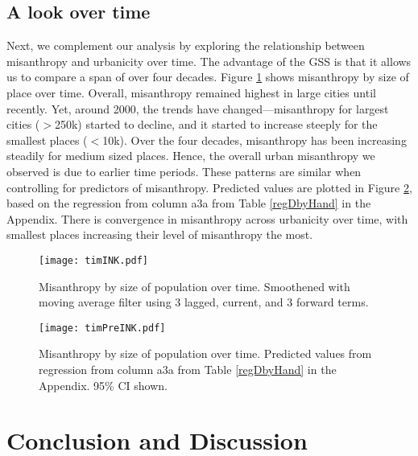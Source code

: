 \documentclass[11pt, letterpaper]{article}
\begin{document}
\begin{spacing}{1.4}
\subsection*{A look over time}

Next, we complement our analysis by exploring the relationship between misanthropy and urbanicity over time. The advantage of the GSS is that it allows us to compare a span of over four decades. Figure \ref{tim} shows misanthropy by size of place over time. Overall, misanthropy remained highest in large cities until recently. Yet, around 2000, the trends have changed---misanthropy for largest cities ($>$250k) started to decline, and it started to increase steeply for the smallest places ($<$10k). Over the four decades, misanthropy has been increasing steadily for medium sized places. Hence, the overall urban misanthropy we observed is due to earlier time periods. 
%
These patterns are similar when controlling for predictors of
misanthropy. Predicted values are plotted in Figure \ref{timPre}, based on the regression from column a3a from Table \ref{regDbyHand} in the Appendix. There is convergence in misanthropy across urbanicity over time, with smallest places increasing their level of misanthropy the most.  
 

\begin{figure}[H]
  \texttt{[image: timINK.pdf]}\centering
\caption{Misanthropy by size of population over time. Smoothened with moving
  average filter using 3 lagged, current, and 3 forward terms.}\label{tim}%
\end{figure}



\begin{figure}[H]
  \texttt{[image: timPreINK.pdf]}\centering
\caption{Misanthropy by size of population over time. Predicted values from regression from column a3a
from Table \ref{regDbyHand} in the Appendix. 95\% CI shown.}\label{timPre}%
\end{figure}



\section*{Conclusion and Discussion}


\end{spacing}
\end{document}
